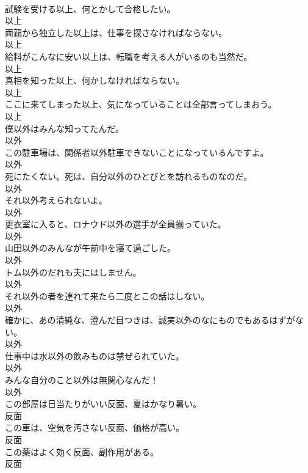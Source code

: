 \documentclass[8pt]{extreport}
\begin{document}
\begin{CJK}{UTF8}{min}
\\	試験を受ける以上、何とかして合格したい。	
\\	以上
\\	両親から独立した以上は、仕事を探さなければならない。	
\\	以上
\\	給料がこんなに安い以上は、転職を考える人がいるのも当然だ。	
\\	以上
\\	真相を知った以上、何かしなければならない。	
\\	以上
\\	ここに来てしまった以上、気になっていることは全部言ってしまおう。	
\\	以上
\\	僕以外はみんな知ってたんだ。	
\\	以外
\\	この駐車場は、関係者以外駐車できないことになっているんですよ。	
\\	以外
\\	死にたくない。死は、自分以外のひとびとを訪れるものなのだ。	
\\	以外
\\	それ以外考えられないよ。	
\\	以外
\\	更衣室に入ると、ロナウド以外の選手が全員揃っていた。	
\\	以外
\\	山田以外のみんなが午前中を寝て過ごした。	
\\	以外
\\	トム以外のだれも夫にはしません。	
\\	以外
\\	それ以外の者を連れて来たら二度とこの話はしない。	
\\	以外
\\	確かに、あの清純な、澄んだ目つきは、誠実以外のなにものでもあるはずがない。	
\\	以外
\\	仕事中は水以外の飲みものは禁ぜられていた。	
\\	以外
\\	みんな自分のこと以外は無関心なんだ！	
\\	以外
\\	この部屋は日当たりがいい反面、夏はかなり暑い。	
\\	反面
\\	この車は、空気を汚さない反面、価格が高い。	
\\	反面
\\	この薬はよく効く反面、副作用がある。	
\\	反面

\end{CJK}
\end{document}
